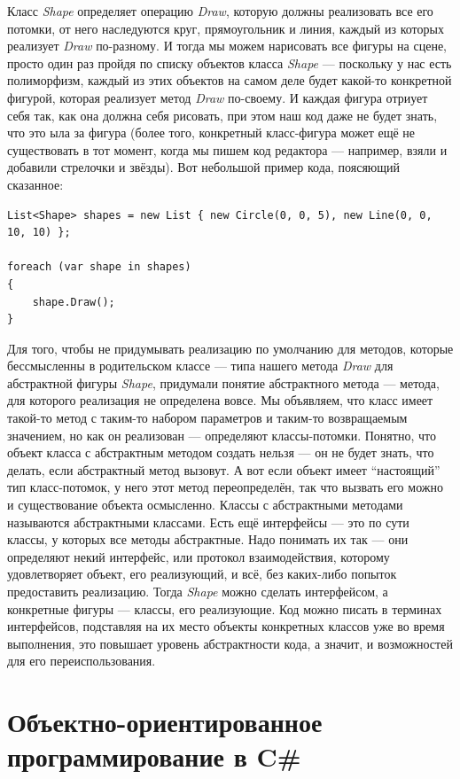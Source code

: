 \documentclass[a5paper]{article}
\begin{document}
Класс \textit{Shape} определяет операцию \textit{Draw}, которую должны реализовать все его потомки, от него наследуются круг, прямоугольник и линия, каждый из которых реализует \textit{Draw} по-разному. И тогда мы можем нарисовать все фигуры на сцене, просто один раз пройдя по списку объектов класса \textit{Shape} --- поскольку у нас есть полиморфизм, каждый из этих объектов на самом деле будет какой-то конкретной фигурой, которая реализует метод \textit{Draw} по-своему. И каждая фигура отриует себя так, как она должна себя рисовать, при этом наш код даже не будет знать, что это ыла за фигура (более того, конкретный класс-фигура может ещё не существовать в тот момент, когда мы пишем код редактора --- например, взяли и добавили стрелочки и звёзды). Вот небольшой пример кода, поясяющий сказанное:

\begin{verbatim}
List<Shape> shapes = new List { new Circle(0, 0, 5), new Line(0, 0, 10, 10) };

foreach (var shape in shapes)
{
    shape.Draw();
}
\end{verbatim}

Для того, чтобы не придумывать реализацию по умолчанию для методов, которые бессмысленны в родительском классе --- типа нашего метода \textit{Draw} для абстрактной фигуры \textit{Shape}, придумали понятие абстрактного метода --- метода, для которого реализация не определена вовсе. Мы объявляем, что класс имеет такой-то метод с таким-то набором параметров и таким-то возвращаемым значением, но как он реализован --- определяют классы-потомки. Понятно, что объект класса с абстрактным методом создать нельзя --- он не будет знать, что делать, если абстрактный метод вызовут. А вот если объект имеет ``настоящий'' тип класс-потомок, у него этот метод переопределён, так что вызвать его можно и существование объекта осмысленно. Классы с абстрактными методами называются абстрактными классами. Есть ещё интерфейсы --- это по сути классы, у которых все методы абстрактные. Надо понимать их так --- они определяют некий интерфейс, или протокол взаимодействия, которому удовлетворяет объект, его реализующий, и всё, без каких-либо попыток предоставить реализацию. Тогда \textit{Shape} можно сделать интерфейсом, а конкретные фигуры --- классы, его реализующие. Код можно писать в терминах интерфейсов, подставляя на их место объекты конкретных классов уже во время выполнения, это повышает уровень абстрактности кода, а значит, и возможностей для его переиспользования.

\section{Объектно-ориентированное программирование в C\#}
\end{document}
